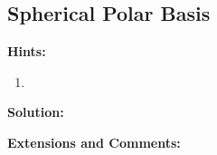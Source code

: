 \subsection{Spherical Polar Basis}

\textbf{Hints:}

\begin{enumerate}
    \item 
\end{enumerate}

\textbf{Solution:}



\textbf{Extensions and Comments:}